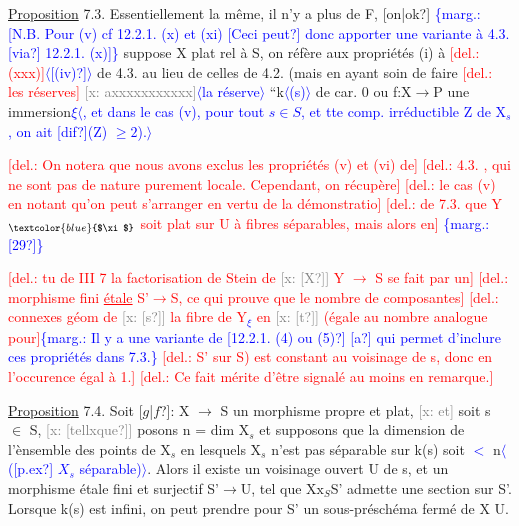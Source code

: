 \documentclass[11pt]{article}
\newcommand{\scanpage}[1]{\par\bigskip\noindent{\small\sffamily[scan #1]}\par}
\newcommand{\mspage}[1]{{\small\sffamily[p.\,#1]}}
\newcommand{\hand}[1]{\textcolor{blue}{#1}}
\newcommand{\inserted}[2][]{\textcolor{blue}{$\langle$#2$\rangle$}}
\newcommand{\margin}[1]{\textcolor{blue}{\{\textsf{marg.:} #1\}}}
\newcommand{\deleted}[1]{\textcolor{red}{[\textsf{del.:} #1]}}
\newcommand{\xout}[1]{\textcolor{gray}{[\textsf{x:} #1]}}
\newcommand{\uline}[1]{\underline{#1}}
\newcommand{\unsure}[1]{[#1?]}
\begin{document}
\uline{Proposition} 7.3. Essentiellement la même, il n'y a plus de F, \unsure{on|ok}
\margin{[N.B. Pour (v) cf 12.2.1. (x) et (xi) \unsure{Ceci peut} donc apporter une variante à 4.3. \unsure{via} 12.2.1. (x)]}
suppose X plat rel à S, on réfère aux propriétés (i) à \deleted{(xxx)}\inserted{\unsure{(iv)}} de 4.3. au
lieu de celles de 4.2. (mais en ayant soin de faire \deleted{les réserves} \xout{axxxxxxxxxxx}\inserted{la réserve}
``k\inserted{(s)} de car. 0 ou f:X$\longrightarrow$P une immersion\hand{$\xi$}\inserted{, et dans le cas (v), pour tout $s\in S$, et tte comp. irréductible Z de X$_s$, on ait \unsure{dif}(Z) $\geq 2$).}

\deleted{On notera que nous avons exclus les propriétés (v) et (vi) de}
\deleted{4.3. , qui ne sont pas de nature purement locale. Cependant, on récupère}
\deleted{le cas (v) en notant qu'on peut s'arranger en vertu de la démonstratio}
\deleted{de 7.3. que Y$_{\hand{$\xi$}}$ soit plat sur U à fibres séparables, mais alors en}
\margin{\unsure{29}}

\clearpage
\scanpage{25/30}
\mspage{26}

\deleted{tu de III 7 la factorisation de Stein de \xout{\unsure{X}} Y $\longrightarrow$ S se fait par un}
\deleted{morphisme fini \uline{étale} S'$\longrightarrow$S, ce qui prouve que le nombre de composantes}
\deleted{connexes géom de \xout{\unsure{s}} la fibre de Y\hand{$_{\xi}$} en \xout{\unsure{t}} (égale au nombre analogue pour}\margin{Il y a une variante de \unsure{12.2.1. (4) ou (5)} \unsure{a} qui permet d'inclure ces propriétés dans 7.3.}
\deleted{S' sur S) est constant au voisinage de s, donc en l'occurence égal à 1.}
\deleted{Ce fait mérite d'être signalé au moins en remarque.}

\uline{Proposition} 7.4. Soit \unsure{$g$|$f$}: X $\longrightarrow$ S un morphisme propre et plat, \xout{et}
soit s $\in$ S, \xout{\unsure{tellxque}} posons n = dim X$_{s}$ et supposons que la dimension de
l'ènsemble des points de X$_{s}$ en lesquels X$_{s}$ n'est pas séparable sur k(s)
soit \hand{$<$} n\inserted{(\unsure{p.ex} $X_s$ séparable)}. Alors il existe un voisinage ouvert U de s, et un morphisme
étale fini et surjectif S'$\longrightarrow$U, tel que X$\mathrm{x}_{S}$S' admette une section sur S'.
Lorsque k(s) est infini, on peut prendre pour S' un sous-préschéma fermé
de X U.
\end{document}
